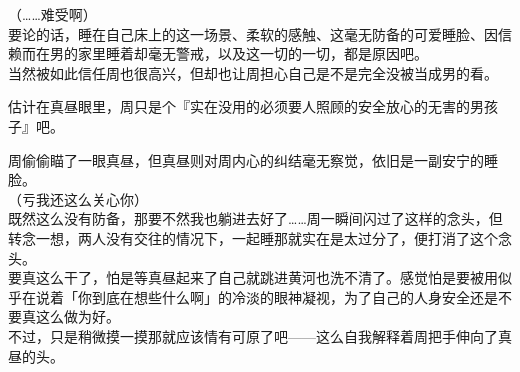 （……难受啊）\\

要论的话，睡在自己床上的这一场景、柔软的感触、这毫无防备的可爱睡脸、因信赖而在男的家里睡着却毫无警戒，以及这一切的一切，都是原因吧。\\

当然被如此信任周也很高兴，但却也让周担心自己是不是完全没被当成男的看。

估计在真昼眼里，周只是个『实在没用的必须要人照顾的安全放心的无害的男孩子』吧。

周偷偷瞄了一眼真昼，但真昼则对周内心的纠结毫无察觉，依旧是一副安宁的睡脸。\\

（亏我还这么关心你）\\

既然这么没有防备，那要不然我也躺进去好了……周一瞬间闪过了这样的念头，但转念一想，两人没有交往的情况下，一起睡那就实在是太过分了，便打消了这个念头。\\

要真这么干了，怕是等真昼起来了自己就跳进黄河也洗不清了。感觉怕是要被用似乎在说着「你到底在想些什么啊」的冷淡的眼神凝视，为了自己的人身安全还是不要真这么做为好。\\

不过，只是稍微摸一摸那就应该情有可原了吧——这么自我解释着周把手伸向了真昼的头。\\

